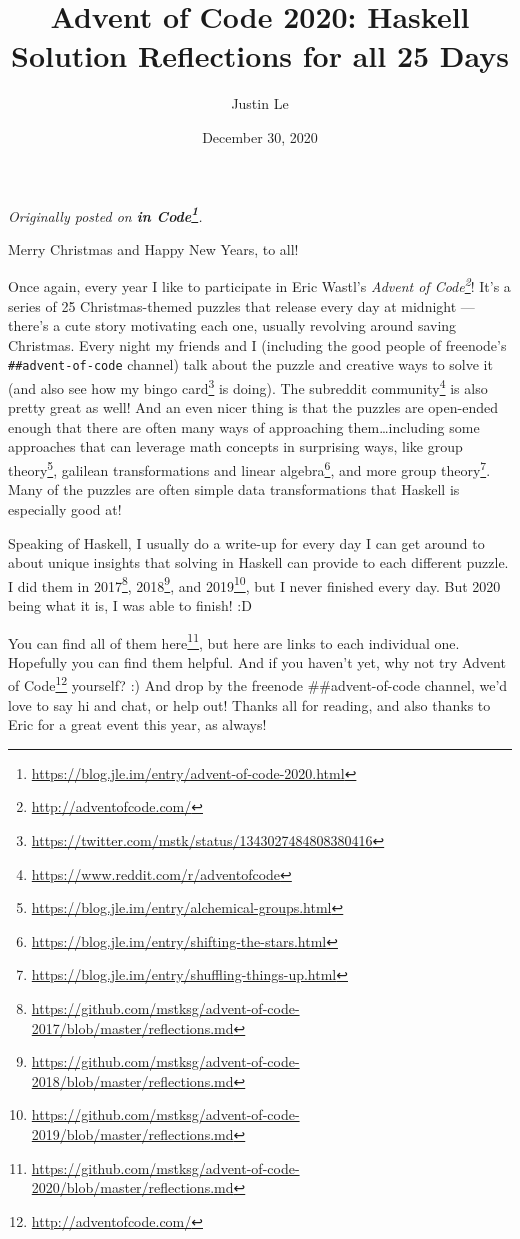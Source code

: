 \documentclass[]{article}
\title{Advent of Code 2020: Haskell Solution Reflections for all 25 Days}
\author{Justin Le}
\date{December 30, 2020}
\renewcommand{\href}[2]{#2\footnote{\url{#1}}}
\begin{document}
\maketitle

\emph{Originally posted on
\textbf{\href{https://blog.jle.im/entry/advent-of-code-2020.html}{in Code}}.}

Merry Christmas and Happy New Years, to all!

Once again, every year I like to participate in Eric Wastl's
\emph{\href{http://adventofcode.com/}{Advent of Code}}! It's a series of 25
Christmas-themed puzzles that release every day at midnight --- there's a cute
story motivating each one, usually revolving around saving Christmas. Every
night my friends and I (including the good people of freenode's
\texttt{\#\#advent-of-code} channel) talk about the puzzle and creative ways to
solve it (and also see how my
\href{https://twitter.com/mstk/status/1343027484808380416}{bingo card} is
doing). The \href{https://www.reddit.com/r/adventofcode}{subreddit community} is
also pretty great as well! And an even nicer thing is that the puzzles are
open-ended enough that there are often many ways of approaching
them\ldots including some approaches that can leverage math concepts in
surprising ways, like
\href{https://blog.jle.im/entry/alchemical-groups.html}{group theory},
\href{https://blog.jle.im/entry/shifting-the-stars.html}{galilean
transformations and linear algebra}, and
\href{https://blog.jle.im/entry/shuffling-things-up.html}{more group theory}.
Many of the puzzles are often simple data transformations that Haskell is
especially good at!

Speaking of Haskell, I usually do a write-up for every day I can get around to
about unique insights that solving in Haskell can provide to each different
puzzle. I did them in
\href{https://github.com/mstksg/advent-of-code-2017/blob/master/reflections.md}{2017},
\href{https://github.com/mstksg/advent-of-code-2018/blob/master/reflections.md}{2018},
and
\href{https://github.com/mstksg/advent-of-code-2019/blob/master/reflections.md}{2019},
but I never finished every day. But 2020 being what it is, I was able to finish!
:D

You can find
\href{https://github.com/mstksg/advent-of-code-2020/blob/master/reflections.md}{all
of them here}, but here are links to each individual one. Hopefully you can find
them helpful. And if you haven't yet, why not try
\href{http://adventofcode.com/}{Advent of Code} yourself? :) And drop by the
freenode \#\#advent-of-code channel, we'd love to say hi and chat, or help out!
Thanks all for reading, and also thanks to Eric for a great event this year, as
always!
\end{document}
